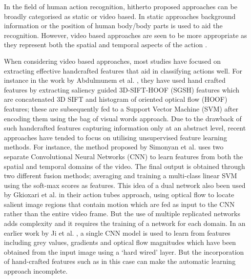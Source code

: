 \documentclass[10pt,twocolumn,letterpaper]{article}
\begin{document}
In the field of human action recognition, hitherto proposed approaches can be broadly categorised as static or video based. In static approaches background information or the position of human body/body parts \cite{Delaitre2010,Raja2011} is used to aid the recognition. However, video based approaches are seen to be more appropriate as they represent both the spatial and temporal aspects of the action \cite{Simonyan2014}. 


	When considering video based approaches, most studies have focused on extracting effective handcrafted features that aid in classifying actions well. For instance in the work by Abdulmunem et al. \cite{Abdulmunem2016}, they have used hand crafted features by extracting saliency guided 3D-SIFT-HOOF (SGSH) features which are concatenated 3D SIFT and histogram of oriented optical flow (HOOF) features; these are subsequently fed to a Support Vector Machine (SVM) after encoding them using the bag of visual words approach. Due to the drawback of such handcrafted features capturing information only at an abstract level, recent approaches have tended to focus on utilising unsupervised feature learning methods. For instance, the method proposed by Simonyan et al. \cite{Simonyan2014} uses two separate Convolutional Neural Networks (CNN) to learn features from both the spatial and temporal domains of the video. The final output is obtained through two different fusion methods; averaging and training a multi-class linear SVM using the soft-max scores as features. This idea of a dual network also been used by Gkioxari et al. \cite{actiontubes}  in their action tubes approach, using optical flow to locate salient image regions that contain motion which are fed as input to the CNN rather than the entire video frame. But the use of multiple replicated networks adds complexity and it requires the training of a network for each domain. In an earlier work by Ji et al. \cite{Ji2013}, a single CNN model is used to learn from features including grey values, gradients and optical flow magnitudes which have been obtained from the input image using a `hard wired' layer. But the incorporation of hand-crafted features such as in this case can make the automatic learning approach incomplete.  
	
\end{document}
